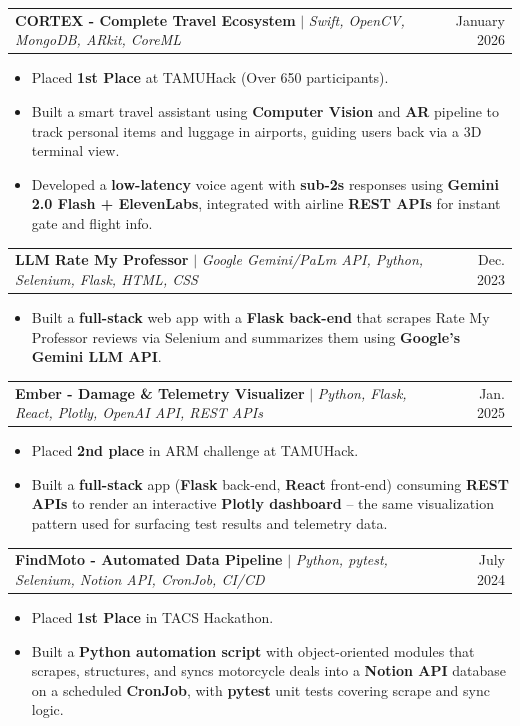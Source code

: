 \documentclass[letterpaper,10pt]{article}
\makeatletter
\newcommand{\resumeItem}[1]{
  \item\small{
    {#1 \vspace{-2pt}}
  }
}
\newcommand{\resumeProjectHeading}[2]{
    \item
    \begin{tabular*}{0.97\textwidth}{l@{\extracolsep{\fill}}r}
      \small#1 & #2 \\
    \end{tabular*}\vspace{-7pt}
}
\newcommand{\resumeItemListStart}{\begin{itemize}[itemsep=-2pt]}
\newcommand{\resumeItemListEnd}{\end{itemize}\vspace{-5pt}}
\makeatother
\begin{document}
    \resumeProjectHeading
          {\textbf{CORTEX - Complete Travel Ecosystem} $|$ \emph{Swift, OpenCV, MongoDB, ARkit, CoreML}}{January 2026}
          \resumeItemListStart
            \resumeItem{Placed \textbf{1st Place} at TAMUHack (Over 650 participants).}
            \resumeItem{Built a smart travel assistant using \textbf{Computer Vision} and \textbf{AR} pipeline to track personal items and luggage in airports, guiding users back via a 3D terminal view.}
            \resumeItem{Developed a \textbf{low-latency} voice agent with \textbf{sub-2s} responses using \textbf{Gemini 2.0 Flash + ElevenLabs}, integrated with airline \textbf{REST APIs} for instant gate and flight info.}
          \resumeItemListEnd

    \resumeProjectHeading
          {\textbf{LLM Rate My Professor} $|$ \emph{Google Gemini/PaLm API, Python, Selenium, Flask, HTML, CSS}}{Dec. 2023}
          \resumeItemListStart
            \resumeItem{Built a \textbf{full-stack} web app with a \textbf{Flask back-end} that scrapes Rate My Professor reviews via Selenium and summarizes them using \textbf{Google's Gemini LLM API}.}
          \resumeItemListEnd

    \resumeProjectHeading
    {\textbf{Ember - Damage \& Telemetry Visualizer} $|$ \emph{Python, Flask, React, Plotly, OpenAI API, REST APIs}}{Jan. 2025}
    \resumeItemListStart
      \resumeItem{Placed \textbf{2nd place} in ARM challenge at TAMUHack.}
      \resumeItem{Built a \textbf{full-stack} app (\textbf{Flask} back-end, \textbf{React} front-end) consuming \textbf{REST APIs} to render an interactive \textbf{Plotly dashboard} -- the same visualization pattern used for surfacing test results and telemetry data.}
    \resumeItemListEnd


    \resumeProjectHeading
          {\textbf{FindMoto - Automated Data Pipeline} $|$ \emph{Python, pytest, Selenium, Notion API, CronJob, CI/CD}}{July 2024}
          \resumeItemListStart
            \resumeItem{Placed \textbf{1st Place} in TACS Hackathon.}
            \resumeItem{Built a \textbf{Python automation script} with object-oriented modules that scrapes, structures, and syncs motorcycle deals into a \textbf{Notion API} database on a scheduled \textbf{CronJob}, with \textbf{pytest} unit tests covering scrape and sync logic.}
          \resumeItemListEnd


    

\end{document}
